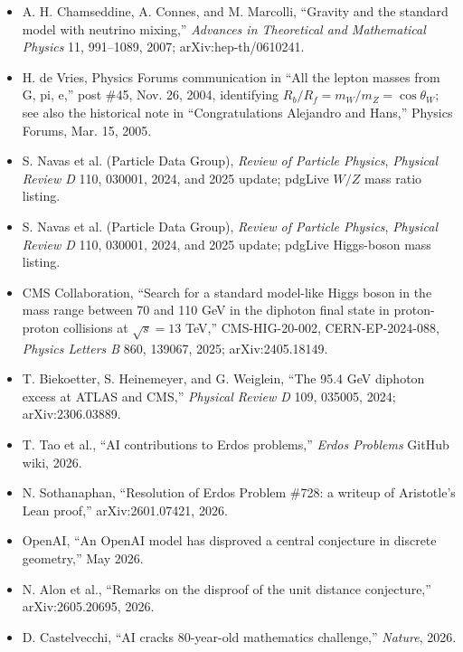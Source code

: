 \documentclass[11pt]{article}
\begin{document}
\begin{itemize}
\item A. H. Chamseddine, A. Connes, and M. Marcolli, ``Gravity and the standard model with neutrino mixing,'' \textit{Advances in Theoretical and Mathematical Physics} 11, 991--1089, 2007; arXiv:hep-th/0610241.
\item H. de Vries, Physics Forums communication in ``All the lepton masses from G, pi, e,'' post \#45, Nov. 26, 2004, identifying \(R_b/R_f=m_W/m_Z=\cos\theta_W\); see also the historical note in ``Congratulations Alejandro and Hans,'' Physics Forums, Mar. 15, 2005.
\item S. Navas et al. (Particle Data Group), \textit{Review of Particle Physics}, \textit{Physical Review D} 110, 030001, 2024, and 2025 update; pdgLive \(W/Z\) mass ratio listing.
\item S. Navas et al. (Particle Data Group), \textit{Review of Particle Physics}, \textit{Physical Review D} 110, 030001, 2024, and 2025 update; pdgLive Higgs-boson mass listing.
\item CMS Collaboration, ``Search for a standard model-like Higgs boson in the mass range between 70 and 110 GeV in the diphoton final state in proton-proton collisions at \(\sqrt{s}=13\) TeV,'' CMS-HIG-20-002, CERN-EP-2024-088, \textit{Physics Letters B} 860, 139067, 2025; arXiv:2405.18149.
\item T. Biekoetter, S. Heinemeyer, and G. Weiglein, ``The 95.4 GeV diphoton excess at ATLAS and CMS,'' \textit{Physical Review D} 109, 035005, 2024; arXiv:2306.03889.
\item T. Tao et al., ``AI contributions to Erdos problems,'' \textit{Erdos Problems} GitHub wiki, 2026.
\item N. Sothanaphan, ``Resolution of Erdos Problem \#728: a writeup of Aristotle's Lean proof,'' arXiv:2601.07421, 2026.
\item OpenAI, ``An OpenAI model has disproved a central conjecture in discrete geometry,'' May 2026.
\item N. Alon et al., ``Remarks on the disproof of the unit distance conjecture,'' arXiv:2605.20695, 2026.
\item D. Castelvecchi, ``AI cracks 80-year-old mathematics challenge,'' \textit{Nature}, 2026.
\end{itemize}
\end{document}
